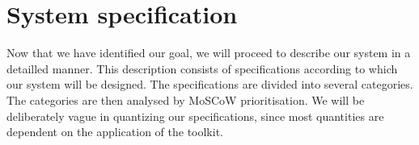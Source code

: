 \documentclass[a4paper, openany, oneside]{memoir}
\begin{document}




\section{System specification}
\label{sec:theory-specs}
Now that we have identified our goal, we will proceed to describe our system in a detailled manner. This description consists of specifications according to which our system will be designed. The specifications are divided into several categories. The categories are then analysed by MoSCoW prioritisation. We will be deliberately vague in quantizing our specifications, since most quantities are dependent on the application of the toolkit.
\end{document}
